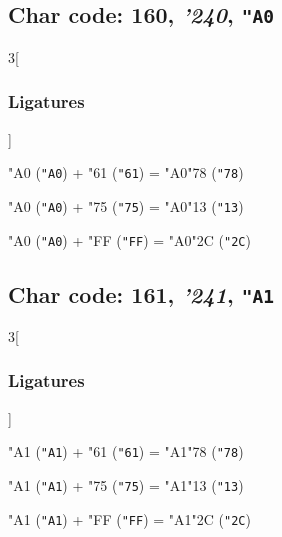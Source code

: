 \documentclass{article}
\newlength{\maxcharwidth}
\begin{document}
\subsection{Char code: 160, {\it'240}, {\tt"A0}}
\label{char_160}


\begin{multicols}{3}[\subsubsection{Ligatures}]

{\testfont\char"A0\noboundary} ({\tt"A0}) + {\testfont\char"61\noboundary} ({\tt"61}) = {\testfont\char"A0\noboundary}{\testfont\char"78\noboundary} ({\tt"78}) 

{\testfont\char"A0\noboundary} ({\tt"A0}) + {\testfont\char"75\noboundary} ({\tt"75}) = {\testfont\char"A0\noboundary}{\testfont\char"13\noboundary} ({\tt"13}) 

{\testfont\char"A0\noboundary} ({\tt"A0}) + {\testfont\char"FF\noboundary} ({\tt"FF}) = {\testfont\char"A0\noboundary}{\testfont\char"2C\noboundary} ({\tt"2C}) 

\end{multicols}

\subsection{Char code: 161, {\it'241}, {\tt"A1}}
\label{char_161}


\begin{multicols}{3}[\subsubsection{Ligatures}]

{\testfont\char"A1\noboundary} ({\tt"A1}) + {\testfont\char"61\noboundary} ({\tt"61}) = {\testfont\char"A1\noboundary}{\testfont\char"78\noboundary} ({\tt"78}) 

{\testfont\char"A1\noboundary} ({\tt"A1}) + {\testfont\char"75\noboundary} ({\tt"75}) = {\testfont\char"A1\noboundary}{\testfont\char"13\noboundary} ({\tt"13}) 

{\testfont\char"A1\noboundary} ({\tt"A1}) + {\testfont\char"FF\noboundary} ({\tt"FF}) = {\testfont\char"A1\noboundary}{\testfont\char"2C\noboundary} ({\tt"2C}) 

\end{multicols}
\end{document}
